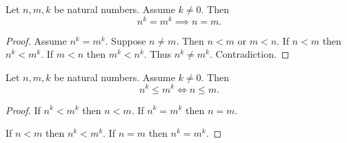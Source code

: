 \documentclass[10pt]{article}
\begin{document}
  \begin{forthel}
    \begin{corollary}
      Let $n, m, k$ be natural numbers.
      Assume $k \neq 0$.
      Then \[ n^{k} = m^{k} \implies n = m. \]
    \end{corollary}
    \begin{proof}
      Assume $n^{k} = m^{k}$.
      Suppose $n \neq m$.
      Then $n < m$ or $m < n$.
      If $n < m$ then $n^{k} < m^{k}$.
      If $m < n$ then $m^{k} < n^{k}$.
      Thus $n^{k} \neq m^{k}$.
      Contradiction.
    \end{proof}
  \end{forthel}

  \begin{forthel}
    \begin{corollary}
      Let $n, m, k$ be natural numbers.
      Assume $k \neq 0$.
      Then \[ n^{k} \leq m^{k} \iff n \leq m. \]
    \end{corollary}
    \begin{proof}
      If $n^{k} < m^{k}$ then $n < m$.
      If $n^{k} = m^{k}$ then $n = m$.

      If $n < m$ then $n^{k} < m^{k}$.
      If $n = m$ then $n^{k} = m^{k}$.
    \end{proof}
  \end{forthel}
\end{document}
